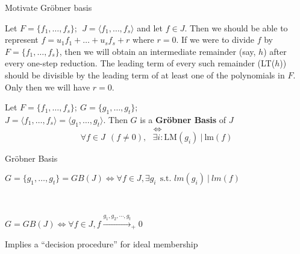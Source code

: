 \documentclass[xcolor=dvipsnames]{beamer}
\begin{document}
\begin{frame}{{\large Motivate Gr\"obner basis}}

Let $F = \{f_1, \dots, f_s\}; ~~ J = \langle f_1, \dots, f_s \rangle$
and let $f \in J$. Then we should be able to represent $f = u_1 f_1 +
\dots + u_s f_s + r$ where $r = 0$. If we were to divide $f$ by $F =
\{f_1, \dots, f_s\}$, then we will obtain an intermediate remainder
(say, $h$) after every one-step reduction. The leading term of every
such remainder (LT($h$)) should be divisible by the leading term of
at least one of the polynomials in $F$. Only then we will have $r = 0$.

\begin{Definition}
Let $F = \{f_1, \dots, f_s\}; ~G = \{g_1, \dots, g_t\};$\\
$ J = \langle f_1, \dots, f_s \rangle = \langle g_1, \dots, g_t
\rangle$.  Then $G$ is a {\bf Gr\"{o}bner Basis} of $J$
\[ ~\iff
\]
\[
\forall f \in J ~~(f\neq 0), ~~~ \exists i : \text{LM}(g_i) ~|~ \text{lm}(f)
\]

\end{Definition}


\end{frame}

\begin{frame}{{\large Gr\"obner Basis}}

\begin{Definition}
$G = \{g_1, \dots, g_t\} = GB(J) \iff \forall f \in J, \exists g_i
~~\text{s.t. } lm( g_i ) ~|~ lm( f )$
\end{Definition}

\ \\
\begin{Definition}
$G = GB(J) \iff \forall f \in J, f \xrightarrow{g_1, g_2, \cdots,
  g_t}_+0$ 
\end{Definition}
Implies a ``decision procedure'' for ideal membership

\end{frame}
\end{document}
